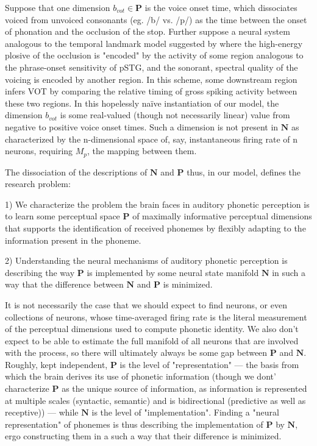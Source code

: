 Suppose that one dimension $b_{vot} \in \mathbf{P}$ is the voice onset time, which dissociates voiced from unvoiced consonants (eg. /b/ vs. /p/) as the time between the onset of phonation and the occlusion of the stop. Further suppose a neural system analogous to the temporal landmark model suggested by \cite{hamiltonSpatialMapOnset2018a} where the high-energy plosive of the occlusion is "encoded" by the activity of some region analogous to the phrase-onset sensitivity of pSTG, and the sonorant, spectral quality of the voicing is encoded by another region. In this scheme, some downstream region  infers VOT by comparing the relative timing of gross spiking activity between these two regions. In this hopelessly na\"ive instantiation of our model, the dimension $b_{vot}$ is some real-valued (though not necessarily linear) value from negative to positive voice onset times. Such a dimension is not present in $\mathbf{N}$ as characterized by the n-dimensional space of, say, instantaneous firing rate of n neurons, requiring $M_p$, the mapping between them. 

The dissociation of the descriptions of $\mathbf{N}$ and $\mathbf{P}$ thus, in our model, defines the research problem: 

1) We characterize the problem the brain faces in auditory phonetic perception is to learn some perceptual space $\mathbf{P}$ of maximally informative perceptual dimensions that supports the identification of received phonemes by flexibly adapting to the information present in the phoneme. 

2) Understanding the neural mechanisms of auditory phonetic perception is describing the way $\mathbf{P}$ is implemented by some neural state manifold $\mathbf{N}$ in such a way that the difference between $\mathbf{N}$ and $\mathbf{P}$ is minimized. 

It is not necessarily the case that we should expect to find neurons, or even collections of neurons, whose time-averaged firing rate is the literal measurement of the perceptual dimensions used to compute phonetic identity. We also don't expect to be able to estimate the full manifold of all neurons that are involved with the process, so there will ultimately always be some gap between $\mathbf{P}$ and $\mathbf{N}$. Roughly, kept independent, $\mathbf{P}$ is the level of "representation" --- the basis from which the brain derives its use of phonetic information (though we dont' characterize $\mathbf{P}$ as the unique source of information, as information is represented at multiple scales (syntactic, semantic) and is bidirectional (predictive as well as receptive)) --- while $\mathbf{N}$ is the level of "implementation". Finding a "neural representation" of phonemes is thus describing the implementation of $\mathbf{P}$ by $\mathbf{N}$, ergo constructing them in a such a way that their difference is minimized. 

